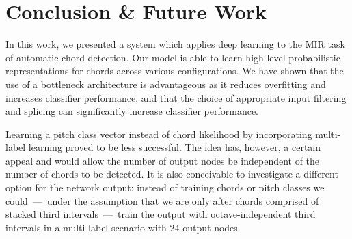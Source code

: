 \documentclass{article}
\begin{document}

\section{Conclusion \& Future Work}
In this work, we presented a system which applies deep learning to the MIR task of automatic chord detection. Our model is able to learn high-level probabilistic representations for chords across various configurations. We have shown that 
the use of a bottleneck architecture is advantageous as it reduces overfitting and increases classifier performance, and that
the choice of appropriate input filtering and splicing can significantly increase classifier performance.

Learning a pitch class vector instead of chord likelihood by incorporating multi-label learning proved to be less successful. The idea has, however, a certain appeal and would allow the number of output nodes be independent of the number of chords to be detected. It is also conceivable to investigate a different option for the network output: instead of training chords or pitch classes we could~---~under the assumption that we are only after chords comprised of stacked third intervals~---~train the output with octave-independent third intervals in a multi-label scenario with $24$ output nodes.


\end{document}
